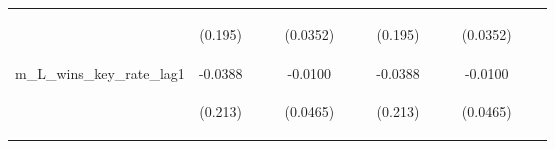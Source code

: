 \documentclass[]{article}
\begin{document}
\begin{center}
\begin{tabular}{lcccccccccccc}
\vspace{4pt} & \begin{footnotesize}(0.195)\end{footnotesize} & \begin{footnotesize}\end{footnotesize} & \begin{footnotesize}\end{footnotesize} & \begin{footnotesize}(0.0352)\end{footnotesize} & \begin{footnotesize}\end{footnotesize} & \begin{footnotesize}\end{footnotesize} & \begin{footnotesize}(0.195)\end{footnotesize} & \begin{footnotesize}\end{footnotesize} & \begin{footnotesize}\end{footnotesize} & \begin{footnotesize}(0.0352)\end{footnotesize} & \begin{footnotesize}\end{footnotesize} & \begin{footnotesize}\end{footnotesize} \\
m\_L\_wins\_key\_rate\_lag1 & -0.0388 &  &  & -0.0100 &  &  & -0.0388 &  &  & -0.0100 &  &  \\
\vspace{4pt} & \begin{footnotesize}(0.213)\end{footnotesize} & \begin{footnotesize}\end{footnotesize} & \begin{footnotesize}\end{footnotesize} & \begin{footnotesize}(0.0465)\end{footnotesize} & \begin{footnotesize}\end{footnotesize} & \begin{footnotesize}\end{footnotesize} & \begin{footnotesize}(0.213)\end{footnotesize} & \begin{footnotesize}\end{footnotesize} & \begin{footnotesize}\end{footnotesize} & \begin{footnotesize}(0.0465)\end{footnotesize} & \begin{footnotesize}\end{footnotesize} & \begin{footnotesize}\end{footnotesize} \\

\end{tabular}
\end{center}
\end{document}
